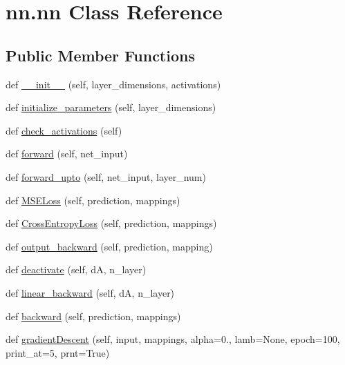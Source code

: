 \hypertarget{classnn_1_1nn}{}\section{nn.\+nn Class Reference}
\label{classnn_1_1nn}
\subsection*{Public Member Functions}
\begin{DoxyCompactItemize}
\item 
def \hyperlink{classnn_1_1nn_ad7304c7932970a07bf2869e97b79e0b5}{\+\_\+\+\_\+init\+\_\+\+\_\+} (self, layer\+\_\+dimensions, activations)
\item 
def \hyperlink{classnn_1_1nn_a9821fed1369b4d709fe297fe9e07d97b}{initialize\+\_\+parameters} (self, layer\+\_\+dimensions)
\item 
def \hyperlink{classnn_1_1nn_a15ee3f3e18ebae83c904b3441ece897d}{check\+\_\+activations} (self)
\item 
def \hyperlink{classnn_1_1nn_ae07002745b03901814d92ac66fe87781}{forward} (self, net\+\_\+input)
\item 
def \hyperlink{classnn_1_1nn_ac3d2b61ed992dc615eacda8e75a61a2b}{forward\+\_\+upto} (self, net\+\_\+input, layer\+\_\+num)
\item 
def \hyperlink{classnn_1_1nn_ae74a0f21e8722ea82a0f94135a81a348}{M\+S\+E\+Loss} (self, prediction, mappings)
\item 
def \hyperlink{classnn_1_1nn_a822299322a0b513f8985e61096be45bc}{Cross\+Entropy\+Loss} (self, prediction, mappings)
\item 
def \hyperlink{classnn_1_1nn_afa7d1462872fae95fe71f27ed00bf7ae}{output\+\_\+backward} (self, prediction, mapping)
\item 
def \hyperlink{classnn_1_1nn_a475811849fd370a47eb0e3b7bc09b283}{deactivate} (self, dA, n\+\_\+layer)
\item 
def \hyperlink{classnn_1_1nn_a0863e90359fa30486c7161cd31c5b4e7}{linear\+\_\+backward} (self, dA, n\+\_\+layer)
\item 
def \hyperlink{classnn_1_1nn_a53a7beb698fe127ebb1f636fccbaa126}{backward} (self, prediction, mappings)
\item 
def \hyperlink{classnn_1_1nn_ae8db320c8333323d55f67c1e77c0128e}{gradient\+Descent} (self, input, mappings, alpha=0., lamb=None, epoch=100, print\+\_\+at=5, prnt=True)
\end{DoxyCompactItemize}
